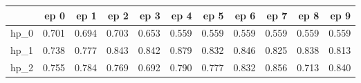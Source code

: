 \begin{tabular}{lrrrrrrrrrr}
\toprule
{} &   ep 0 &   ep 1 &   ep 2 &   ep 3 &   ep 4 &   ep 5 &   ep 6 &   ep 7 &   ep 8 &   ep 9 \\
\midrule
hp\_0 &  0.701 &  0.694 &  0.703 &  0.653 &  0.559 &  0.559 &  0.559 &  0.559 &  0.559 &  0.559 \\
hp\_1 &  0.738 &  0.777 &  0.843 &  0.842 &  0.879 &  0.832 &  0.846 &  0.825 &  0.838 &  0.813 \\
hp\_2 &  0.755 &  0.784 &  0.769 &  0.692 &  0.790 &  0.777 &  0.832 &  0.856 &  0.713 &  0.840 \\
\bottomrule
\end{tabular}
